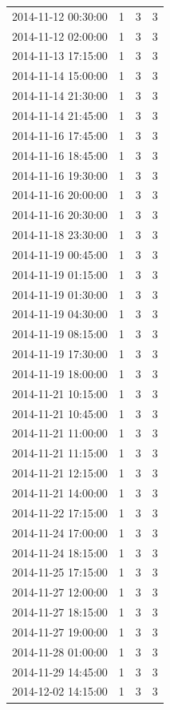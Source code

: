 \begin{tabular}{lrrr}
2014-11-12 00:30:00 & 1 & 3 & 3 \\
2014-11-12 02:00:00 & 1 & 3 & 3 \\
2014-11-13 17:15:00 & 1 & 3 & 3 \\
2014-11-14 15:00:00 & 1 & 3 & 3 \\
2014-11-14 21:30:00 & 1 & 3 & 3 \\
2014-11-14 21:45:00 & 1 & 3 & 3 \\
2014-11-16 17:45:00 & 1 & 3 & 3 \\
2014-11-16 18:45:00 & 1 & 3 & 3 \\
2014-11-16 19:30:00 & 1 & 3 & 3 \\
2014-11-16 20:00:00 & 1 & 3 & 3 \\
2014-11-16 20:30:00 & 1 & 3 & 3 \\
2014-11-18 23:30:00 & 1 & 3 & 3 \\
2014-11-19 00:45:00 & 1 & 3 & 3 \\
2014-11-19 01:15:00 & 1 & 3 & 3 \\
2014-11-19 01:30:00 & 1 & 3 & 3 \\
2014-11-19 04:30:00 & 1 & 3 & 3 \\
2014-11-19 08:15:00 & 1 & 3 & 3 \\
2014-11-19 17:30:00 & 1 & 3 & 3 \\
2014-11-19 18:00:00 & 1 & 3 & 3 \\
2014-11-21 10:15:00 & 1 & 3 & 3 \\
2014-11-21 10:45:00 & 1 & 3 & 3 \\
2014-11-21 11:00:00 & 1 & 3 & 3 \\
2014-11-21 11:15:00 & 1 & 3 & 3 \\
2014-11-21 12:15:00 & 1 & 3 & 3 \\
2014-11-21 14:00:00 & 1 & 3 & 3 \\
2014-11-22 17:15:00 & 1 & 3 & 3 \\
2014-11-24 17:00:00 & 1 & 3 & 3 \\
2014-11-24 18:15:00 & 1 & 3 & 3 \\
2014-11-25 17:15:00 & 1 & 3 & 3 \\
2014-11-27 12:00:00 & 1 & 3 & 3 \\
2014-11-27 18:15:00 & 1 & 3 & 3 \\
2014-11-27 19:00:00 & 1 & 3 & 3 \\
2014-11-28 01:00:00 & 1 & 3 & 3 \\
2014-11-29 14:45:00 & 1 & 3 & 3 \\
2014-12-02 14:15:00 & 1 & 3 & 3 \\

\end{tabular}
